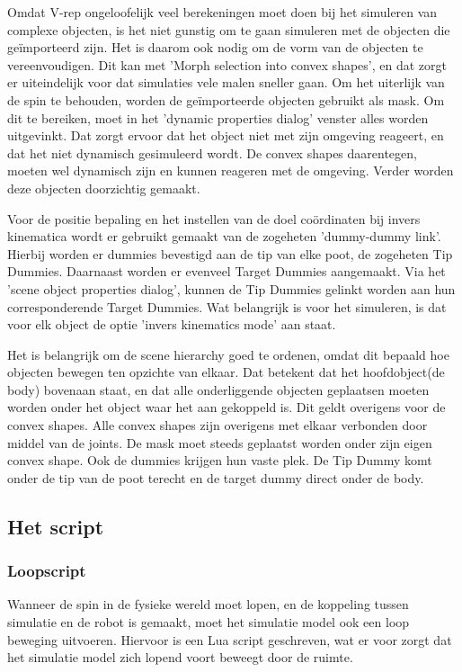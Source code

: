 \documentclass[10pt,a4paper]{article}
\begin{document}
Omdat V-rep ongeloofelijk veel berekeningen moet doen bij het simuleren van complexe objecten, is het niet gunstig om te gaan simuleren met de objecten die ge\"importeerd zijn. Het is daarom ook nodig om de vorm van de objecten te vereenvoudigen. Dit kan met 'Morph selection into convex shapes', en dat zorgt er uiteindelijk voor dat simulaties vele malen sneller gaan. 
Om het uiterlijk van de spin te behouden, worden de ge\"importeerde objecten gebruikt als mask. Om dit te bereiken, moet in het 'dynamic properties dialog' venster alles worden uitgevinkt. Dat zorgt ervoor dat het object niet met zijn omgeving reageert, en dat het niet dynamisch gesimuleerd wordt.
De convex shapes daarentegen, moeten wel dynamisch zijn en kunnen reageren met de omgeving. Verder worden deze objecten doorzichtig gemaakt.

Voor de positie bepaling en het instellen van de doel co\"ordinaten bij invers kinematica wordt er gebruikt gemaakt van de zogeheten 'dummy-dummy link'. Hierbij worden er dummies bevestigd aan de tip van elke poot, de zogeheten Tip Dummies. Daarnaast worden er evenveel Target Dummies aangemaakt. Via het 'scene object properties dialog', kunnen de Tip Dummies gelinkt worden aan hun corresponderende Target Dummies. Wat belangrijk is voor het simuleren, is dat voor elk object de optie 'invers kinematics mode' aan staat.

Het is belangrijk om de scene hierarchy goed te ordenen, omdat dit bepaald hoe objecten bewegen ten opzichte van elkaar. Dat betekent dat het hoofdobject(de body) bovenaan staat, en dat alle onderliggende objecten geplaatsen moeten worden onder het object waar het aan gekoppeld is. Dit geldt overigens voor de convex shapes. Alle convex shapes zijn overigens met elkaar verbonden door middel van de joints. De mask moet steeds geplaatst worden onder zijn eigen convex shape. Ook de dummies krijgen hun vaste plek. De Tip Dummy komt onder de tip van de poot terecht en de target dummy direct onder de body.


\subsection{Het script}

\subsubsection{Loopscript}
Wanneer de spin in de fysieke wereld moet lopen, en de koppeling tussen simulatie en de robot is gemaakt, moet het simulatie model ook een loop beweging uitvoeren. Hiervoor is een Lua script geschreven, wat er voor zorgt dat het simulatie model zich lopend voort beweegt door de ruimte.
\end{document}
